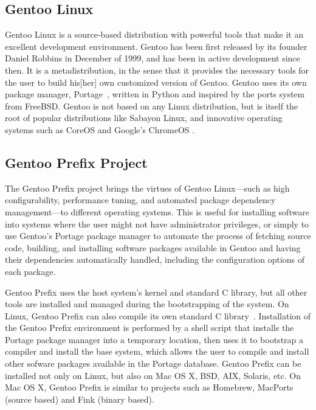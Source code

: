 \documentclass[a4paper,conference]{IEEEtran}
\begin{document}
\subsection{Gentoo Linux}

Gentoo Linux \cite{gentoo} is a source-based distribution with powerful
tools that make it an excellent development environment. Gentoo has been
first released by its founder Daniel Robbins in December of 1999, and
has been in active development since then. It is a metadistribution, in
the sense that it provides the necessary tools for the user to build
his[her] own customized version of Gentoo. Gentoo uses its own package
manager, Portage~\cite{gentoo:portage}, written in Python and inspired
by the ports system from FreeBSD. Gentoo is not based on any Linux
distribution, but is itself the root of popular distributions like
Sabayon Linux, and innovative operating systems such as
CoreOS \cite{coreos} and Google's ChromeOS \cite{chromiumos}.

\subsection{Gentoo Prefix Project}
\label{sec:portage}

The Gentoo Prefix project \cite{gentoo:prefix} brings the virtues of
Gentoo Linux---such as high configurability, performance tuning, and
automated package dependency management---to different operating
systems. This is useful for installing software into systems where the
user might not have administrator privileges, or simply to use Gentoo's
Portage package manager to automate the process of fetching source code,
building, and installing software packages available in Gentoo and
having their dependencies automatically handled, including the
configuration options of each package.

Gentoo Prefix uses the host system's kernel and standard C library, but
all other tools are installed and managed during the bootstrapping of
the system. On Linux, Gentoo Prefix can also compile its own standard C
library~\cite{gentoo:rap}. Installation of the Gentoo Prefix environment
is performed by a shell script that installs the Portage package manager
into a temporary location, then uses it to bootstrap a compiler and
install the base system, which allows the user to compile and install
other sofware packages available in the Portage database. Gentoo Prefix
can be installed not only on Linux, but also on Mac OS X, BSD, AIX,
Solaris, etc. On Mac OS X, Gentoo Prefix is similar to projects
such as Homebrew, MacPorts (source based) and Fink (binary based).
\end{document}
